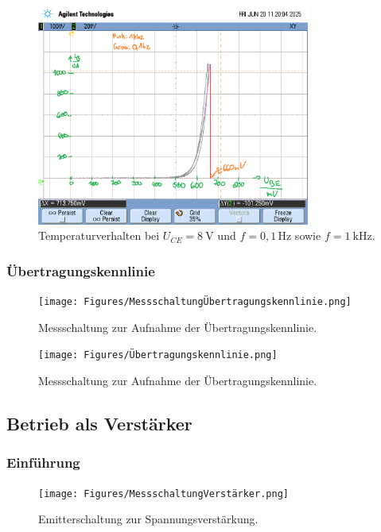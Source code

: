 \documentclass[
	a4paper, %
	12pt, %
]{CSUniSchoolLabReport}
\begin{document}
\begin{figure}[H]
	\centering
	\includegraphics[width=0.8\textwidth]{Figures/8V1khz0.1hzzusammentemp.png}
	\caption{Temperaturverhalten bei $U_{CE} = \SI{8}{\volt}$ und $f = 0{,}1\,\mathrm{Hz}$ sowie $f = \SI{1}{\kilo\hertz}$.}
	\label{fig:8V1khz0.1hzzusammentemp}
\end{figure}

\subsubsection{Übertragungskennlinie}
\begin{figure}[H]
	\centering
	\texttt{[image: Figures/MessschaltungÜbertragungskennlinie.png]}
	\caption{Messschaltung zur Aufnahme der Übertragungskennlinie.}
	\label{fig:MessschaltungÜbertragungskennlinie}
\end{figure}
\begin{figure}[H]
	\centering
	\texttt{[image: Figures/Übertragungskennlinie.png]}
	\caption{Messschaltung zur Aufnahme der Übertragungskennlinie.}
	\label{fig:Übertragungskennlinie}
\end{figure}

\subsection{Betrieb als Verstärker}
\subsubsection{Einführung}
\begin{figure}[h]
	\centering
	\texttt{[image: Figures/MessschaltungVerstärker.png]}
	\caption{Emitterschaltung zur Spannungsverstärkung.}
	\label{fig:MessschaltungVerstärker}
\end{figure}
\end{document}
